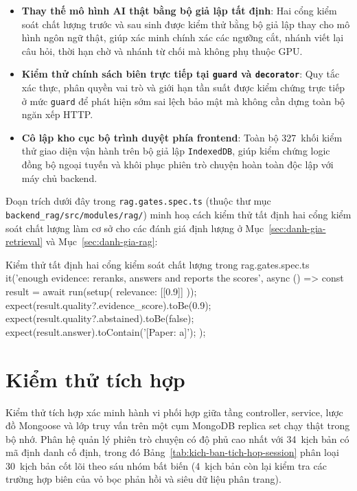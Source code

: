 \begin{itemize}
\item[--] \textbf{Thay thế mô hình AI thật bằng bộ giả lập tất định}: Hai cổng kiểm soát chất lượng trước và sau sinh được kiểm thử bằng bộ giả lập thay cho mô hình ngôn ngữ thật, giúp xác minh chính xác các ngưỡng cắt, nhánh viết lại câu hỏi, thời hạn chờ và nhánh từ chối mà không phụ thuộc GPU.
\item[--] \textbf{Kiểm thử chính sách biên trực tiếp tại \texttt{guard} và \texttt{decorator}}: Quy tắc xác thực, phân quyền vai trò và giới hạn tần suất được kiểm chứng trực tiếp ở mức \texttt{guard} để phát hiện sớm sai lệch bảo mật mà không cần dựng toàn bộ ngăn xếp HTTP.
\item[--] \textbf{Cô lập kho cục bộ trình duyệt phía frontend}: Toàn bộ 327~khối kiểm thử giao diện vận hành trên bộ giả lập \texttt{IndexedDB}, giúp kiểm chứng logic đồng bộ ngoại tuyến và khôi phục phiên trò chuyện hoàn toàn độc lập với máy chủ backend.
\end{itemize}

Đoạn trích dưới đây trong \texttt{rag.gates.spec.ts} (thuộc thư mục \texttt{backend\_\allowbreak{}rag/\allowbreak{}src/\allowbreak{}modules/\allowbreak{}rag/}) minh hoạ cách kiểm thử tất định hai cổng kiểm soát chất lượng làm cơ sở cho các đánh giá định lượng ở Mục~\ref{sec:danh-gia-retrieval} và Mục~\ref{sec:danh-gia-rag}:

\begin{tsbox}{Kiểm thử tất định hai cổng kiểm soát chất lượng trong rag.gates.spec.ts}
it('enough evidence: reranks, answers and reports the scores', async () => {
  const result = await run(setup({ relevance: [[0.9]] }));
  expect(result.quality?.evidence_score).toBe(0.9);
  expect(result.quality?.abstained).toBe(false);
  expect(result.answer).toContain('[Paper: a]');
});
\end{tsbox}

\section{Kiểm thử tích hợp}
\label{sec:integration-testing}

Kiểm thử tích hợp xác minh hành vi phối hợp giữa tầng controller, service, lược đồ Mongoose và lớp truy vấn trên một cụm MongoDB replica set chạy thật trong bộ nhớ. Phân hệ quản lý phiên trò chuyện có độ phủ cao nhất với 34~kịch bản có mã định danh cố định, trong đó Bảng~\ref{tab:kich-ban-tich-hop-session} phân loại 30~kịch bản cốt lõi theo sáu nhóm bất biến (4~kịch bản còn lại kiểm tra các trường hợp biên của vỏ bọc phản hồi và siêu dữ liệu phân trang).

